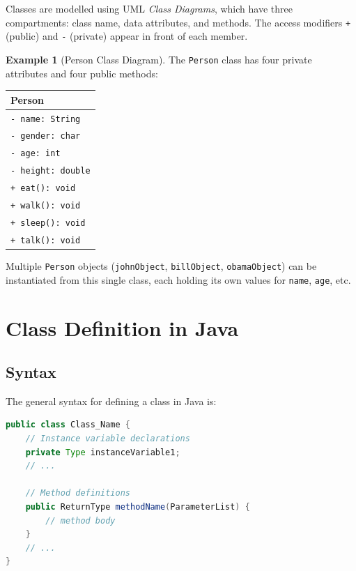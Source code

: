 \documentclass[11pt, a4paper, notitlepage]{report}
\theoremstyle{definition}
\theoremstyle{remark}
\theoremstyle{definition}
\newtheorem{example}[theorem]{Example}
\begin{document}
Classes are modelled using UML \emph{Class Diagrams}, which have three compartments: class name, data attributes, and methods. The access modifiers \texttt{+} (public) and \texttt{-} (private) appear in front of each member.

\begin{example}[Person Class Diagram]
\label{ex:ch2-person-uml}
The \texttt{Person} class has four private attributes and four public methods:
\begin{center}
\begin{tabular}{|l|}
\hline
\textbf{Person} \\ \hline
\texttt{- name: String} \\
\texttt{- gender: char} \\
\texttt{- age: int} \\
\texttt{- height: double} \\ \hline
\texttt{+ eat(): void} \\
\texttt{+ walk(): void} \\
\texttt{+ sleep(): void} \\
\texttt{+ talk(): void} \\ \hline
\end{tabular}
\end{center}
Multiple \texttt{Person} objects (\texttt{johnObject}, \texttt{billObject}, \texttt{obamaObject}) can be instantiated from this single class, each holding its own values for \texttt{name}, \texttt{age}, etc.
\end{example}

\section{Class Definition in Java}
\label{sec:ch2-class-definition}

\subsection{Syntax}
\label{sec:ch2-syntax}

The general syntax for defining a class in Java is:

\begin{lstlisting}[language=Java, caption={General class definition syntax}]
public class Class_Name {
    // Instance variable declarations
    private Type instanceVariable1;
    // ...

    // Method definitions
    public ReturnType methodName(ParameterList) {
        // method body
    }
    // ...
}
\end{lstlisting}
\end{document}
